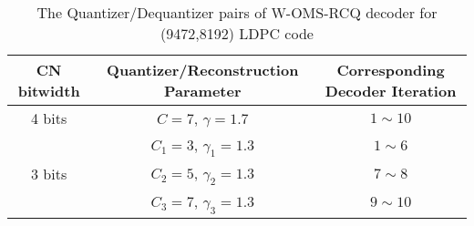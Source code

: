 \begin{table}[t]
    \centering
    \caption {The Quantizer/Dequantizer pairs of W-OMS-RCQ decoder for (9472,8192) LDPC code}
    \label{tab: 8k_config}
    \begin{tabular}{|c|c|c|}
    \hline
     CN bitwidth             & Quantizer/Reconstruction Parameter & Corresponding Decoder Iteration \\ \hline
    4 bits                  & $C=7$, $\gamma=1.7$                                                                       & $1\sim10$                                                                        \\ \hline
    \multirow{3}{*}{3 bits} & $C_1=3$, $\gamma_1=1.3$                                                                     & $1\sim6$                                                                         \\ \cline{2-3} 
                            & $C_2=5$, $\gamma_2=1.3$                                                                    & $7\sim8$                                                                         \\ \cline{2-3} 
                            & $C_3=7$, $\gamma_3=1.3$                                                                      & $9\sim10$                                                                        \\ \hline
    \end{tabular}
    \end{table}